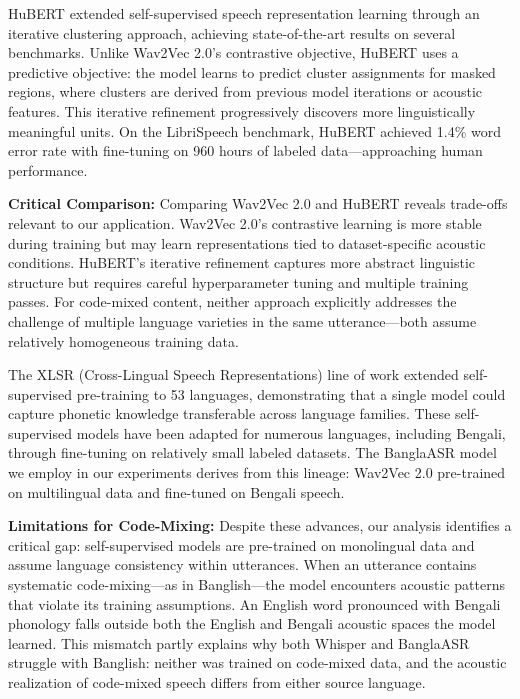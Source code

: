 HuBERT \cite{Hsu2021} extended self-supervised speech representation learning through an iterative clustering approach, achieving state-of-the-art results on several benchmarks. Unlike Wav2Vec 2.0's contrastive objective, HuBERT uses a predictive objective: the model learns to predict cluster assignments for masked regions, where clusters are derived from previous model iterations or acoustic features. This iterative refinement progressively discovers more linguistically meaningful units. On the LibriSpeech benchmark, HuBERT achieved 1.4\% word error rate with fine-tuning on 960 hours of labeled data---approaching human performance.

\textbf{Critical Comparison:} Comparing Wav2Vec 2.0 and HuBERT reveals trade-offs relevant to our application. Wav2Vec 2.0's contrastive learning is more stable during training but may learn representations tied to dataset-specific acoustic conditions. HuBERT's iterative refinement captures more abstract linguistic structure but requires careful hyperparameter tuning and multiple training passes. For code-mixed content, neither approach explicitly addresses the challenge of multiple language varieties in the same utterance---both assume relatively homogeneous training data.

The XLSR (Cross-Lingual Speech Representations) line of work \cite{Conneau2021} extended self-supervised pre-training to 53 languages, demonstrating that a single model could capture phonetic knowledge transferable across language families. These self-supervised models have been adapted for numerous languages, including Bengali, through fine-tuning on relatively small labeled datasets. The BanglaASR model we employ in our experiments derives from this lineage: Wav2Vec 2.0 pre-trained on multilingual data and fine-tuned on Bengali speech.

\textbf{Limitations for Code-Mixing:} Despite these advances, our analysis identifies a critical gap: self-supervised models are pre-trained on monolingual data and assume language consistency within utterances. When an utterance contains systematic code-mixing---as in Banglish---the model encounters acoustic patterns that violate its training assumptions. An English word pronounced with Bengali phonology falls outside both the English and Bengali acoustic spaces the model learned. This mismatch partly explains why both Whisper and BanglaASR struggle with Banglish: neither was trained on code-mixed data, and the acoustic realization of code-mixed speech differs from either source language.


